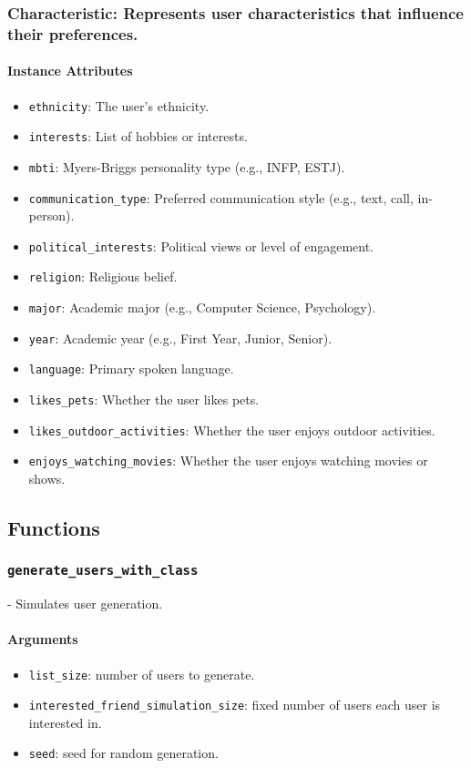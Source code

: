 \documentclass[fontsize=11pt]{article}
\begin{document}
\subsubsection*{Characteristic: Represents user characteristics that influence their preferences.}


\paragraph{Instance Attributes}
\begin{itemize}
    \item \texttt{ethnicity}: The user's ethnicity.
    \item \texttt{interests}: List of hobbies or interests.
    \item \texttt{mbti}: Myers-Briggs personality type (e.g., INFP, ESTJ).
    \item \texttt{communication\_type}: Preferred communication style (e.g., text, call, in-person).
    \item \texttt{political\_interests}: Political views or level of engagement.
    \item \texttt{religion}: Religious belief.
    \item \texttt{major}: Academic major (e.g., Computer Science, Psychology).
    \item \texttt{year}: Academic year (e.g., First Year, Junior, Senior).
    \item \texttt{language}: Primary spoken language.
    \item \texttt{likes\_pets}: Whether the user likes pets.
    \item \texttt{likes\_outdoor\_activities}: Whether the user enjoys outdoor activities.
    \item \texttt{enjoys\_watching\_movies}: Whether the user enjoys watching movies or shows.
\end{itemize}

\subsection*{Functions}

\subsubsection*{\texttt{generate\_users\_with\_class}}
- Simulates user generation.

\paragraph{Arguments}
\begin{itemize}
    \item \texttt{list\_size}: number of users to generate.
    \item \texttt{interested\_friend\_simulation\_size}: fixed number of users each user is interested in.
    \item \texttt{seed}: seed for random generation.
\end{itemize}
\end{document}
